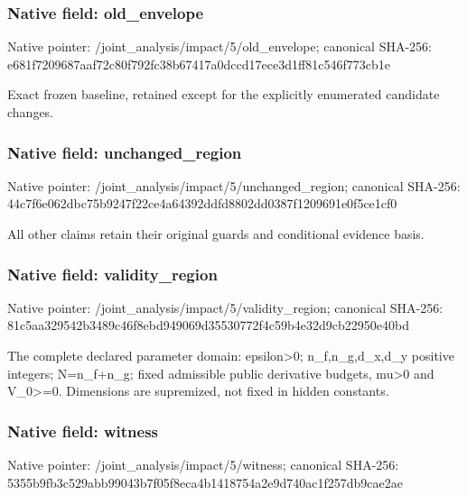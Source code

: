 \documentclass[10pt,a4paper]{article}
\begin{document}
\subsubsection{Native field: old\_\allowbreak{}envelope}
Native pointer: /joint\_\allowbreak{}analysis/impact/5/old\_\allowbreak{}envelope; canonical SHA-256: e681f7209687aaf72c80f792fc38b67417a0dccd17ece3d1ff81c546f773cb1e

\begingroup\raggedright\sloppy Exact frozen baseline,\allowbreak{} retained except for the explicitly enumerated candidate changes.\par\endgroup

\subsubsection{Native field: unchanged\_\allowbreak{}region}
Native pointer: /joint\_\allowbreak{}analysis/impact/5/unchanged\_\allowbreak{}region; canonical SHA-256: 44c7f6e062dbc75b9247f22ce4a64392ddfd8802dd0387f1209691e0f5ce1cf0

\begingroup\raggedright\sloppy All other claims retain their original guards and conditional evidence basis.\par\endgroup

\subsubsection{Native field: validity\_\allowbreak{}region}
Native pointer: /joint\_\allowbreak{}analysis/impact/5/validity\_\allowbreak{}region; canonical SHA-256: 81c5aa329542b3489c46f8ebd949069d35530772f4c59b4e32d9cb22950e40bd

\begingroup\raggedright\sloppy The complete declared parameter domain:\allowbreak{} epsilon>0;\allowbreak{} n\_\allowbreak{}f,\allowbreak{}n\_\allowbreak{}g,\allowbreak{}d\_\allowbreak{}x,\allowbreak{}d\_\allowbreak{}y positive integers;\allowbreak{} N=\allowbreak{}n\_\allowbreak{}f+n\_\allowbreak{}g;\allowbreak{} fixed admissible public derivative budgets,\allowbreak{} mu>0 and V\_\allowbreak{}0>=\allowbreak{}0. Dimensions are supremized,\allowbreak{} not fixed in hidden constants.\par\endgroup

\subsubsection{Native field: witness}
Native pointer: /joint\_\allowbreak{}analysis/impact/5/witness; canonical SHA-256: 5355b9fb3c529abb99043b7f05f8eca4b1418754a2e9d740ac1f257db9cae2ae
\end{document}
